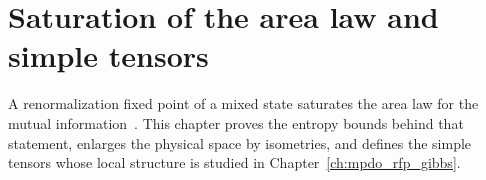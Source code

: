 \chapter{Saturation of the area law and simple tensors}
\label{ch:mpdo_rfp_area_law}

A renormalization fixed point of a mixed state saturates the area law for the
mutual information~\cite{Cirac2016MPDO_arXiv}. This chapter proves the entropy
bounds behind that statement, enlarges the physical space by isometries, and
defines the simple tensors whose local structure is studied in
Chapter~\ref{ch:mpdo_rfp_gibbs}.





